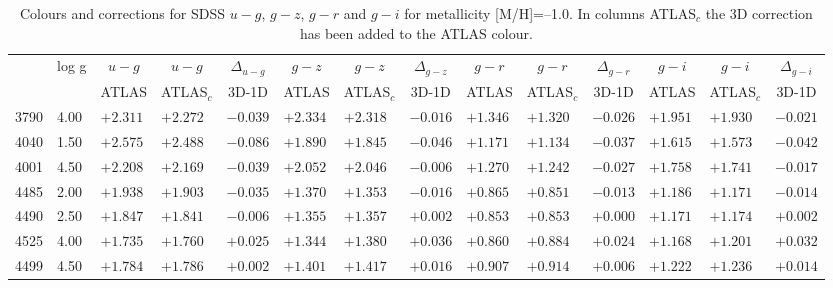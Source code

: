 \documentclass[]{aa}
\def\teff{$T\rm_{eff}$}
\begin{document}
\begin{appendix}
\begin{table*}
\caption{\label{SDSS_1_m10}
Colours and corrections for  SDSS $u-g$, $g-z$, $g-r$ and $g-i$ for metallicity [M/H]=--1.0. In columns ATLAS$_c$ the 3D correction
has been added to the ATLAS colour.  }
\renewcommand{\tabcolsep}{3pt}
\tabskip=0pt
\begin{center}
\begin{tabular}{llllllllllllll}
\hline\noalign{\smallskip}
\multicolumn{1}{c}{\teff} & 
\multicolumn{1}{c}{log g} & 
\multicolumn{1}{c}{$u-g$} &
\multicolumn{1}{c}{$u-g$} &
\multicolumn{1}{c}{$\Delta_{u-g}$} &
\multicolumn{1}{c}{$g-z$} &
\multicolumn{1}{c}{$g-z$} &
\multicolumn{1}{c}{$\Delta_{g-z}$} &
\multicolumn{1}{c}{$g-r$} &
\multicolumn{1}{c}{$g-r$} &
\multicolumn{1}{c}{$\Delta_{g-r}$} & 
\multicolumn{1}{c}{$g-i$} &
\multicolumn{1}{c}{$g-i$} &
\multicolumn{1}{c}{$\Delta_{g-i}$} \\
\multicolumn{2}{c}{ } &  
\multicolumn{1}{c}{ATLAS} &
\multicolumn{1}{c}{ATLAS$_c$}&
\multicolumn{1}{c}{3D-1D}&
\multicolumn{1}{c}{ATLAS} &
\multicolumn{1}{c}{ATLAS$_c$}&
\multicolumn{1}{c}{3D-1D}&
\multicolumn{1}{c}{ATLAS} &
\multicolumn{1}{c}{ATLAS$_c$}&
\multicolumn{1}{c}{3D-1D}&
\multicolumn{1}{c}{ATLAS} &
\multicolumn{1}{c}{ATLAS$_c$}&
\multicolumn{1}{c}{3D-1D} \\
\hline\noalign{\smallskip}
\hline\noalign{\smallskip}
3790  &4.00 & $+2.311$ & $+2.272$ & $-0.039$ & $+2.334$ & $+2.318$ & $-0.016$ & $+1.346$ & $+1.320$ & $-0.026$ & $+1.951$ & $+1.930$ & $-0.021$ \\
4040  &1.50 & $+2.575$ & $+2.488$ & $-0.086$ & $+1.890$ & $+1.845$ & $-0.046$ & $+1.171$ & $+1.134$ & $-0.037$ & $+1.615$ & $+1.573$ & $-0.042$ \\
4001  &4.50 & $+2.208$ & $+2.169$ & $-0.039$ & $+2.052$ & $+2.046$ & $-0.006$ & $+1.270$ & $+1.242$ & $-0.027$ & $+1.758$ & $+1.741$ & $-0.017$ \\
4485  &2.00 & $+1.938$ & $+1.903$ & $-0.035$ & $+1.370$ & $+1.353$ & $-0.016$ & $+0.865$ & $+0.851$ & $-0.013$ & $+1.186$ & $+1.171$ & $-0.014$ \\
4490  &2.50 & $+1.847$ & $+1.841$ & $-0.006$ & $+1.355$ & $+1.357$ & $+0.002$ & $+0.853$ & $+0.853$ & $+0.000$ & $+1.171$ & $+1.174$ & $+0.002$ \\
4525  &4.00 & $+1.735$ & $+1.760$ & $+0.025$ & $+1.344$ & $+1.380$ & $+0.036$ & $+0.860$ & $+0.884$ & $+0.024$ & $+1.168$ & $+1.201$ & $+0.032$ \\
4499  &4.50 & $+1.784$ & $+1.786$ & $+0.002$ & $+1.401$ & $+1.417$ & $+0.016$ & $+0.907$ & $+0.914$ & $+0.006$ & $+1.222$ & $+1.236$ & $+0.014$ \\

\end{tabular}
\end{center}
\end{table*}
\end{appendix}
\end{document}
